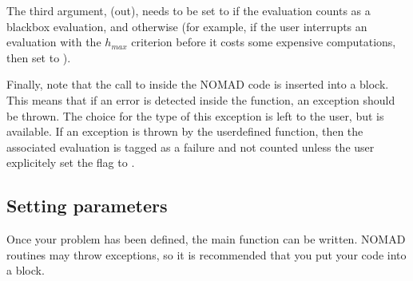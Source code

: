 \documentclass[letterpaper,10pt,english]{sphinxmanual}
\begin{document}
\sphinxAtStartPar
The third argument,  (out), needs to be set to  if the evaluation counts as a blackbox
evaluation, and  otherwise (for example, if the user interrupts an evaluation with the \(h_{max}\)
criterion before it costs some expensive computations, then set  to ).

\sphinxAtStartPar
Finally, note that the call to  inside the NOMAD code  is inserted into a  block.
This means that if an error is detected inside the  function,  an exception should be thrown.
The choice for the type of this exception is left to the user, but   is available.
If an exception is thrown by the user\sphinxhyphen{}defined function, then the associated evaluation  is tagged as a failure
and not counted unless the user explicitely set the flag  to .


\subsection{Setting parameters}
\label{\detokenize{LibraryMode:setting-parameters}}
\sphinxAtStartPar
Once your problem has been defined, the main function can be written. NOMAD routines may throw  exceptions,
so it is recommended that you put your code into a  block.
\end{document}
